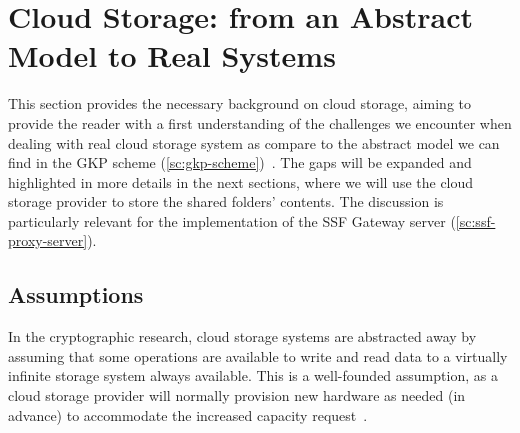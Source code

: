 \section{Cloud Storage: from an Abstract Model to Real Systems}\label{sc:cloud-storage}

This section provides the necessary background on cloud storage,
aiming to provide the reader with a first understanding of the challenges
we encounter when dealing with real cloud storage system
as compare to the abstract model we can find in the GKP scheme (\cref{sc:gkp-scheme})~\cite{GKP}.
The gaps will be expanded and highlighted in more details in the next sections,
where we will use the cloud storage provider to store the shared folders' contents.
The discussion is particularly relevant for the implementation of the
SSF Gateway server (\cref{sc:ssf-proxy-server}).

\subsection{Assumptions}
In the cryptographic research, cloud storage systems are abstracted away by assuming
that some operations are available to write and read data to a virtually
infinite storage system always available.
This is a well-founded assumption, as a cloud storage provider
will normally provision new hardware as needed (in advance) to accommodate the
increased capacity request~\cite{AzureBlobStorage}.


